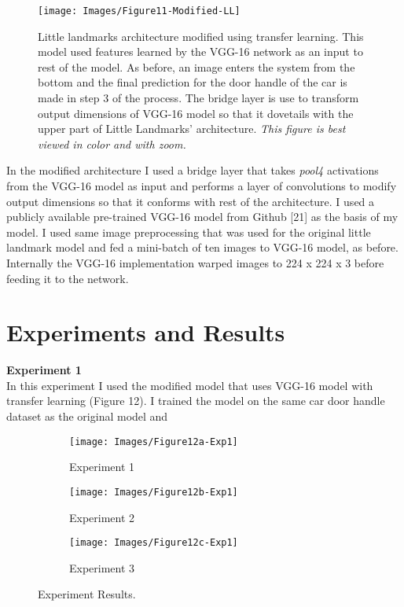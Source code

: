 \documentclass [11pt,letterpaper ,twoside ,openany ]{report}
\begin{document}
    \begin{figure}[h]
      \centering
      \texttt{[image: Images/Figure11-Modified-LL]}
      \caption{Little landmarks architecture modified using transfer learning. This model used features learned by the VGG-16 network as an input to rest of the model. As before, an image enters the system from the bottom and the final prediction for the door handle of the car is made in step 3 of the process. The bridge layer is use to transform output dimensions of VGG-16 model so that it dovetails with the upper part of Little Landmarks' architecture. \textit{This figure is best viewed in color and with zoom.}}
      \label{fig:tl_arch}
    \end{figure}        

    In the modified architecture I used a bridge layer that takes \textit{pool4} activations from the VGG-16 model as input and performs a layer of convolutions to modify output dimensions so that it conforms with rest of the architecture. I used a publicly available pre-trained VGG-16 model from Github [21] as the basis of my model. I used same image preprocessing that was used for the original little landmark model and fed a mini-batch of ten images to VGG-16 model, as before. Internally the VGG-16 implementation warped images to 224 x 224 x 3 before feeding it to the network.    

    \section{Experiments and Results}

    \noindent
    \textbf{Experiment 1}\\    
    In this experiment I used the modified model that uses VGG-16 model with transfer learning (Figure 12). I trained the model on the same car door handle dataset as the original model and 

    \begin{wrapfigure}{l}[9mm]{0.5\textwidth}
        \begin{subfigure}[b]{\linewidth}
            \texttt{[image: Images/Figure12a-Exp1]}
            \caption{Experiment 1}
        \end{subfigure}
        \begin{subfigure}[b]{\linewidth}
            \texttt{[image: Images/Figure12b-Exp1]}
            \caption{Experiment 2}
        \end{subfigure}
        \begin{subfigure}[b]{\linewidth}
            \texttt{[image: Images/Figure12c-Exp1]}
            \caption{Experiment 3}
        \end{subfigure}        
        \caption{Experiment Results.}
    \end{wrapfigure}   
\end{document}
